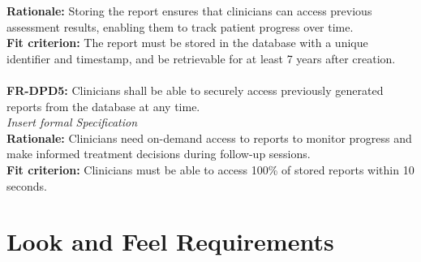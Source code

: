 \documentclass[12pt]{article}
\begin{document}
\textbf{Rationale: }Storing the report ensures that clinicians can access previous assessment results, enabling them to track patient progress over time.\\
\textbf{Fit criterion: }The report must be stored in the database with a unique identifier and timestamp, and be retrievable for at least 7 years after creation.\\
\\
\noindent\textbf{FR-DPD5: }Clinicians shall be able to securely access previously generated reports from the database at any time.\\
\textit{Insert formal Specification}\\
\textbf{Rationale: }Clinicians need on-demand access to reports to monitor progress and make informed treatment decisions during follow-up sessions.\\
\textbf{Fit criterion: }Clinicians must be able to access 100\% of stored reports within 10 seconds.\\

\section{Look and Feel Requirements}
\end{document}
